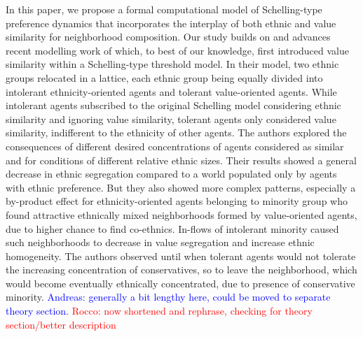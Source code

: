 \documentclass[
]{article}
\begin{document}
In this paper, we propose a formal computational model of Schelling-type
preference dynamics that incorporates the interplay of both ethnic and
value similarity for neighborhood composition. Our study builds on and
advances recent modelling work of \cite{paolillo2018} which, to best of
our knowledge, first introduced value similarity within a Schelling-type
threshold model. In their model, two ethnic groups relocated in a
lattice, each ethnic group being equally divided into intolerant
ethnicity-oriented agents and tolerant value-oriented agents. While
intolerant agents subscribed to the original Schelling model considering
ethnic similarity and ignoring value similarity, tolerant agents only
considered value similarity, indifferent to the ethnicity of other
agents. The authors explored the consequences of different desired
concentrations of agents considered as similar and for conditions of
different relative ethnic sizes. Their results showed a general decrease
in ethnic segregation compared to a world populated only by agents with
ethnic preference. But they also showed more complex patterns,
especially a by-product effect for ethnicity-oriented agents belonging
to minority group who found attractive ethnically mixed neighborhoods
formed by value-oriented agents, due to higher chance to find
co-ethnics. In-flows of intolerant minority caused such neighborhoods to
decrease in value segregation and increase ethnic homogeneity. The
authors observed until when tolerant agents would not tolerate the
increasing concentration of conservatives, so to leave the neighborhood,
which would become eventually ethnically concentrated, due to presence
of conservative minority.
\textcolor{blue}{{Andreas: }generally a bit lengthy here, could be moved to separate theory section.}
{\textcolor{red}{Rocco: now shortened and rephrase, checking for theory section/better description}}
\end{document}
